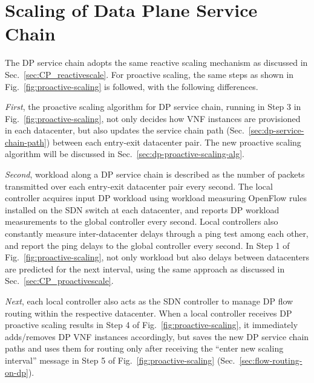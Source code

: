 \vspace{-3mm}
\section{Scaling of Data Plane Service Chain}
\label{sec:scalims-dp}

The DP service chain adopts the same reactive scaling mechanism as discussed in Sec.~\ref{sec:CP_reactivescale}. For proactive scaling, the same steps %
as shown in Fig.~\ref{fig:proactive-scaling} is followed, with the following differences.

{\em First}, the proactive scaling algorithm for DP service chain, running in Step 3 in Fig.~\ref{fig:proactive-scaling}, not only decides how VNF instances are provisioned in each datacenter, but also updates the service chain path (Sec.~\ref{sec:dp-service-chain-path}) between each entry-exit datacenter pair. The new proactive scaling algorithm will be discussed in Sec.~\ref{sec:dp-proactive-scaling-alg}.

{\em Second}, workload along a DP service chain is described as the number of packets transmitted over each entry-exit datacenter pair every second. The local controller acquires input DP workload using workload measuring OpenFlow rules installed on the SDN switch at each datacenter, and reports DP workload measurements to the global controller every second. Local controllers also constantly measure inter-datacenter delays through a ping test among each other, and report the ping delays to the global controller every second. In Step 1 of Fig.~\ref{fig:proactive-scaling}, not only workload but also delays between datacenters are predicted for the next interval, using the same approach as discussed in Sec.~\ref{sec:CP_proactivescale}.

{\em Next}, each local controller also acts as the SDN controller to manage DP flow routing within the respective datacenter. When a local controller receives DP proactive scaling results in Step 4 of Fig.~\ref{fig:proactive-scaling}, it immediately adds/removes DP VNF instances accordingly, but saves the new DP service chain paths and uses them for routing only after receiving the ``enter new scaling interval'' message in Step 5 of Fig.~\ref{fig:proactive-scaling} (Sec.~\ref{sec:flow-routing-on-dp}).



